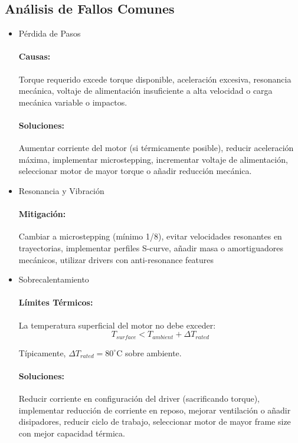 \subsection{Análisis de Fallos Comunes}
\begin{itemize}

    \item{Pérdida de Pasos}

\paragraph{Causas:}Torque requerido excede torque disponible, aceleración excesiva, resonancia mecánica, voltaje de alimentación insuficiente a alta velocidad o carga mecánica variable o impactos.

\paragraph{Soluciones:}Aumentar corriente del motor (si térmicamente posible), reducir aceleración máxima, implementar microstepping, incrementar voltaje de alimentación, seleccionar motor de mayor torque o añadir reducción mecánica.

    \item{Resonancia y Vibración}

\paragraph{Mitigación:}Cambiar a microstepping (mínimo 1/8), evitar velocidades resonantes en trayectorias, implementar perfiles S-curve, añadir masa o amortiguadores mecánicos, utilizar drivers con anti-resonance features

    \item {Sobrecalentamiento}

\paragraph{Límites Térmicos:}La temperatura superficial del motor no debe exceder:
\begin{equation}
T_{surface} < T_{ambient} + \Delta T_{rated}
\end{equation}

Típicamente, $\Delta T_{rated} = 80^\circ$C sobre ambiente.

\paragraph{Soluciones:}Reducir corriente en configuración del driver (sacrificando torque), implementar reducción de corriente en reposo, mejorar ventilación o añadir disipadores, reducir ciclo de trabajo, seleccionar motor de mayor frame size con mejor capacidad térmica.
\end{itemize}
